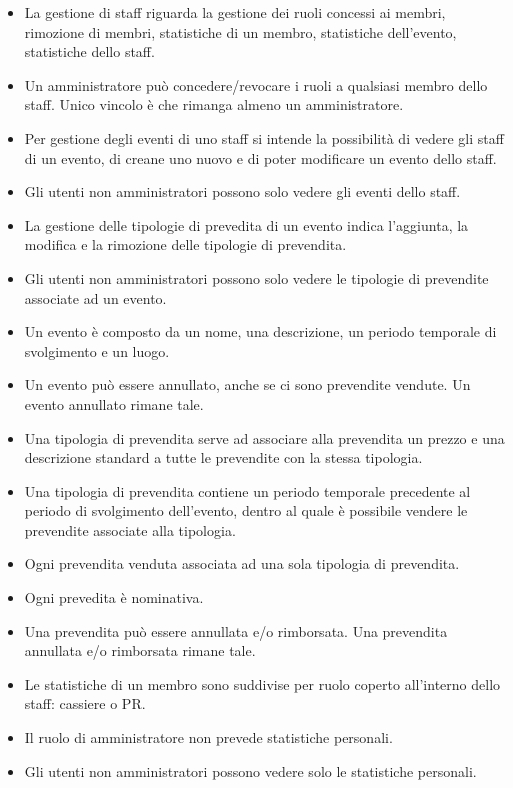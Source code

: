 \documentclass[a4paper]{article}
\begin{document}
\begin{itemize}
\begin{itemize}
		\item La gestione di staff riguarda la gestione dei ruoli concessi ai membri, rimozione di membri, statistiche di un membro, statistiche dell'evento, statistiche dello staff.
		
		\item Un amministratore può concedere/revocare i ruoli a qualsiasi membro dello staff. Unico vincolo è che rimanga almeno un amministratore.
	   
		\item Per gestione degli eventi di uno staff si intende la possibilità di vedere gli staff di un evento, di creane uno nuovo e di poter modificare un evento dello staff.
		\item Gli utenti non amministratori possono solo vedere gli eventi dello staff.
		
		\item La gestione delle tipologie di prevedita di un evento indica l'aggiunta, la modifica e la rimozione delle tipologie di prevendita.
		\item Gli utenti non amministratori possono solo vedere le tipologie di prevendite associate ad un evento.
		
		\item Un evento è composto da un nome, una descrizione, un periodo temporale di svolgimento e un luogo. 
		\item Un evento può essere annullato, anche se ci sono prevendite vendute. Un evento annullato rimane tale.
		
		\item Una tipologia di prevendita serve ad associare alla prevendita un prezzo e una descrizione standard a tutte le prevendite con la stessa tipologia.
		\item Una tipologia di prevendita contiene un periodo temporale precedente al periodo di svolgimento dell'evento, dentro al quale è possibile vendere le prevendite associate alla tipologia.
		
		\item Ogni prevendita venduta  associata ad una sola tipologia di prevendita.
		\item Ogni prevedita è nominativa.
		\item Una prevendita può essere annullata e/o rimborsata. Una prevendita annullata e/o rimborsata rimane tale.
		
		\item Le statistiche di un membro sono suddivise per ruolo coperto all'interno dello staff: cassiere o PR.
		\item Il ruolo di amministratore non prevede statistiche personali.
		\item Gli utenti non amministratori possono vedere solo le statistiche personali.	
	\end{itemize}
	

\end{itemize}
\end{document}
